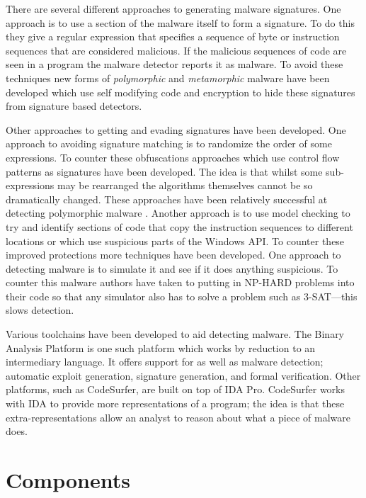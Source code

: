 \documentclass[10pt,]{book}
\begin{document}
There are several different approaches to generating malware signatures.
One approach is to use a section of the malware itself to form a
signature. To do this they give a regular expression that specifies a
sequence of byte or instruction sequences that are considered malicious.
If the malicious sequences of code are seen in a program the malware
detector reports it as malware. To avoid these techniques new forms of
\emph{polymorphic} and \emph{metamorphic} malware have been developed
which use self modifying code and encryption to hide these signatures
from signature based detectors\autocite{Christodorescu:2005vf}.

Other approaches to getting and evading signatures have been developed.
One approach to avoiding signature matching is to randomize the order of
some
expressions\autocite{Borello:2008vx}\autocite{Christodorescu:2005vf}. To
counter these obfuscations approaches which use control flow patterns as
signatures have been developed\autocite{Bonfante:2007th}. The idea is
that whilst some sub-expressions may be rearranged the algorithms
themselves cannot be so dramatically changed. These approaches have been
relatively successful at detecting polymorphic malware
\autocite{Kang:2011bs}\autocite{Bruschi:vb}. Another approach is to use
model checking to try and identify sections of code that copy the
instruction sequences to different locations or which use suspicious
parts of the Windows API\autocite{Kinder:2005hu}. To counter these
improved protections more techniques have been developed. One approach
to detecting malware is to simulate it and see if it does anything
suspicious. To counter this malware authors have taken to putting in
NP-HARD problems into their code so that any simulator also has to solve
a problem such as 3-SAT\autocite{Moser:2007cd}---this slows detection.

Various toolchains have been developed to aid detecting malware. The
Binary Analysis Platform\autocite{Brumley:wn} is one such platform which
works by reduction to an intermediary language. It offers support for as
well as malware detection; automatic exploit
generation\autocite{Avgerinos:vo}, signature generation, and formal
verification. Other platforms, such as
CodeSurfer\autocite{Balakrishnan:2005tx}, are built on top of IDA
Pro\autocite{HexRays:up}. CodeSurfer works with IDA to provide more
representations of a program; the idea is that these
extra-representations allow an analyst to reason about what a piece of
malware does.

\chapter{Components}
\end{document}
